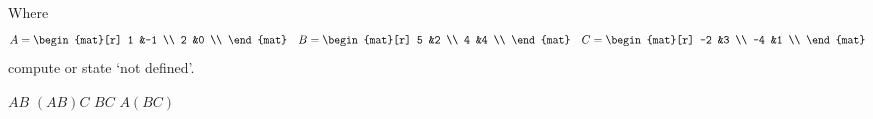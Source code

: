 \begin{exercises}
\begin{answer}
    \end{answer}
  \recommended \item  
    Where
    \begin{equation*}
      A=
       \begin{mat}[r]
         1  &-1  \\
         2  &0   \\
       \end{mat}
      \quad
      B=
       \begin{mat}[r]
         5  &2   \\
         4  &4   \\
       \end{mat}
      \quad
      C=
       \begin{mat}[r]
        -2  &3   \\
        -4  &1   \\
       \end{mat}
    \end{equation*}
    compute or state `not defined'.
    \begin{exparts*}
      \partsitem \( AB \)
      \partsitem \( (AB)C \)
      \partsitem \( BC \)
      \partsitem \( A(BC) \)
    \end{exparts*}
    \begin{answer}  
\end{answer}
\end{exercises}
